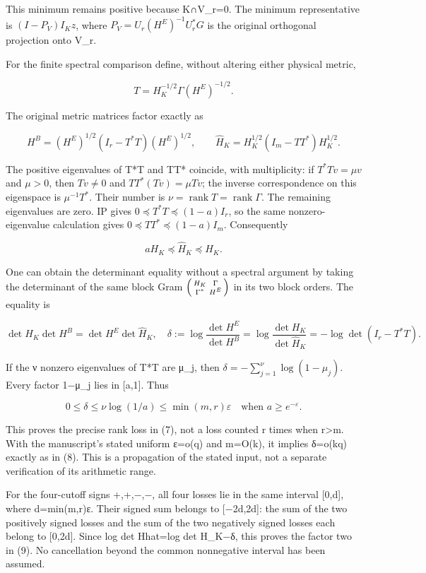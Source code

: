 \documentclass[11pt]{article}
\begin{document}
This minimum remains positive because K∩V\_r=0. The minimum representative is \((I-P_V)I_Kz\), where \(P_V=U_r(H^E)^{-1}U_r^*G\) is the original orthogonal projection onto V\_r.

For the finite spectral comparison define, without altering either physical metric,

\[
T=H_K^{-1/2}\Gamma(H^E)^{-1/2}.
\]

The original metric matrices factor exactly as

\[
H^B=(H^E)^{1/2}(I_r-T^*T)(H^E)^{1/2},\qquad
\widehat H_K=H_K^{1/2}(I_m-TT^*)H_K^{1/2}.
\]

The positive eigenvalues of T*T and TT* coincide, with multiplicity: if \(T^*Tv=\mu v\) and \(\mu>0\), then \(Tv\ne0\) and \(TT^*(Tv)=\mu Tv\); the inverse correspondence on this eigenspace is \(\mu^{-1}T^*\). Their number is \(\nu=\operatorname{rank}T=\operatorname{rank}\Gamma\). The remaining eigenvalues are zero. IP gives \(0\preceq T^*T\preceq(1-a)I_r\), so the same nonzero-eigenvalue calculation gives \(0\preceq TT^*\preceq(1-a)I_m\). Consequently

\[
aH_K\preceq\widehat H_K\preceq H_K. \tag{F5}
\]

One can obtain the determinant equality without a spectral argument by taking the determinant of the same block Gram \(\begin{psmallmatrix}H_K&\Gamma\\\Gamma^*&H^E\end{psmallmatrix}\) in its two block orders. The equality is

\[
\det H_K\det H^B=\det H^E\det\widehat H_K,
\quad
\delta:=\log\frac{\det H^E}{\det H^B}
=\log\frac{\det H_K}{\det\widehat H_K}
=-\log\det(I_r-T^*T). \tag{F6}
\]

If the ν nonzero eigenvalues of T*T are μ\_j, then \(\delta=-\sum_{j=1}^{\nu}\log(1-\mu_j)\). Every factor 1−μ\_j lies in {[}a,1{]}. Thus

\[
0\le\delta\le\nu\log(1/a)\le\min(m,r)\varepsilon
\quad\text{when }a\ge e^{-\varepsilon}. \tag{F7}
\]

This proves the precise rank loss in (7), not a loss counted r times when r\textgreater m. With the manuscript's stated uniform ε=o(q) and m=O(k), it implies δ=o(kq) exactly as in (8). This is a propagation of the stated input, not a separate verification of its arithmetic range.

For the four-cutoff signs +,+,−,−, all four losses lie in the same interval {[}0,d{]}, where d=min(m,r)ε. Their signed sum belongs to {[}−2d,2d{]}: the sum of the two positively signed losses and the sum of the two negatively signed losses each belong to {[}0,2d{]}. Since log det Hhat=log det H\_K−δ, this proves the factor two in (9). No cancellation beyond the common nonnegative interval has been assumed.
\end{document}

